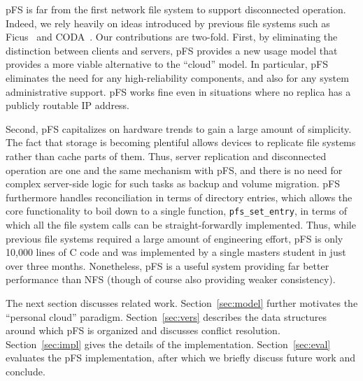 pFS is far from the first network file system to support disconnected
operation.  Indeed, we rely heavily on ideas introduced by previous
file systems such as Ficus~\cite{page:ficus} and
CODA~\cite{kistler:coda}.  Our contributions are two-fold.  First, by
eliminating the distinction between clients and servers, pFS provides
a new usage model that provides a more viable alternative to the
``cloud'' model.  In particular, pFS eliminates the need for any
high-reliability components, and also for any system administrative
support.  pFS works fine even in situations where no replica has a
publicly routable IP address.

Second, pFS capitalizes on hardware trends to gain a large amount of
simplicity.  The fact that storage is becoming plentiful allows
devices to replicate file systems rather than cache parts of them.
Thus, server replication and disconnected operation are one and the
same mechanism with pFS, and there is no need for complex server-side
logic for such tasks as backup and volume migration.  pFS furthermore
handles reconciliation in terms of directory entries, which allows the
core functionality to boil down to a single function,
\texttt{pfs\_set\_entry}, in terms of which all the file system calls
can be straight-forwardly implemented.  Thus, while previous file
systems required a large amount of engineering effort, pFS is only
10,000 lines of C code and was implemented by a single masters student
in just over three months.  Nonetheless, pFS is a useful system
providing far better performance than NFS (though of course also
providing weaker consistency).

The next section discusses related work.  Section~\ref{sec:model}
further motivates the ``personal cloud'' paradigm.
Section~\ref{sec:vers} describes the data structures around which pFS
is organized and discusses conflict resolution.
Section~\ref{sec:impl} gives the details of the implementation.
Section~\ref{sec:eval} evaluates the pFS implementation, after which
we briefly discuss future work and conclude.

